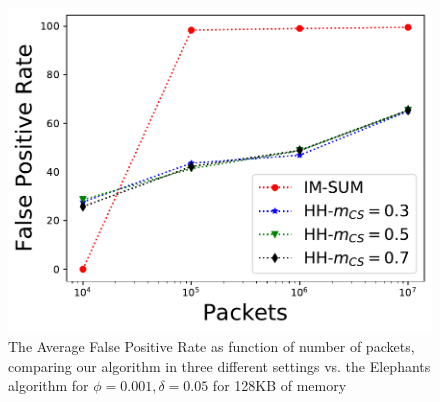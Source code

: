 \begin{figure} \centering
    \includegraphics[width=\linewidth]{HH/figures/FPR_per_pkts_m=0.125.pdf}
    \caption[Average False Positive for 128KB of memory]{The Average False Positive Rate as function of number of packets, comparing our algorithm in three different settings vs. the Elephants algorithm for $\phi=0.001,\delta=0.05$ for 128KB of memory}
    \label{fig:fig3_c}
\end{figure}

